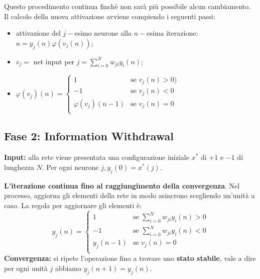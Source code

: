 Questo procedimento continua finchè non sarà più possibile alcun cambiamento.
\newline
\newline
Il calcolo della nuova attivazione avviene compiendo i seguenti passi:
\begin{itemize}
    \item attivazione del $j-$esimo neurone alla $n-$esima iterazione: $n=y_j(n)\varphi(v_j(n))$;
    \item $v_j=$ net input per $j=\sum_{i=0}^Nw_{ji}y_i(n)$;
    \item $\varphi(v_j)(n)=
        \begin{cases}
            1                   & \text{se } v_j(n)>0)\\
            -1                  & \text{se } v_j(n)<0\\
            \varphi(v_j)(n-1)   & \text{se } v_j(n)=0\\
        \end{cases}$
\end{itemize}
\newpage
\subsection{Fase 2: Information Withdrawal}
\textbf{Input:} alla rete viene presentata una configurazione iniziale $x^*$ di $+1$ e $-1$ di lunghezza $N$. Per ogni neurone $j, y_j(0) = x^*(j)$.


\textbf{L'iterazione continua fino al raggiungimento della convergenza}. Nel processo, aggiorna gli elementi della rete in modo asincrono scegliendo un'unità a caso. La regola per aggiornare gli elementi è:
\begin{equation}
        y_j(n)=
        \begin{cases}
            1               & \text{se } \sum_{i=0}^Nw_{ji}y_i(n)>0\\
            -1              & \text{se } \sum_{i=0}^Nw_{ji}y_i(n)<0\\
            y_j(n-1)        & \text{se } v_j(n)=0\\
        \end{cases}
\end{equation}
\textbf{Convergenza:} si ripete l'operazione fino a trovare uno \textbf{stato stabile}, vale a dire per ogni unità $j$ abbiamo $y_j(n+1) = y_j(n)$.



